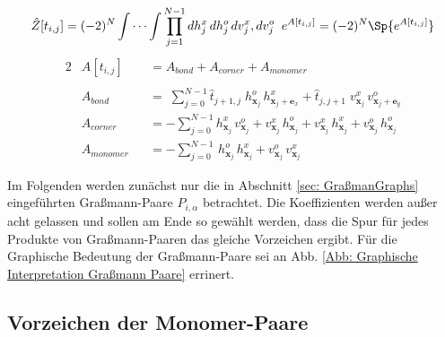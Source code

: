 \begin{grayframe}[frametitle = {Ausdruck für Pseudo-Zustandssumme mit Graßmann Variablen}]

\begin{equation}
    \begin{aligned}
        \hat{Z}[t_{i,j}]  & = (-2)^N \int \cdots \int\prod_{j=1}^{N-1} dh_{j}^x\,dh_{j}^o\,dv_{j}^x,dv_{j}^o \;\;e^{A[t_{i,j}] } = (-2)^N \Sp{e^{A[t_{i,j}] }} \nonumber\\
    \end{aligned}
\end{equation}
\begin{alignat}{2}
        & A[t_{i,j}]   &&= A_{bond} + A_{corner} + A_{monomer} \nonumber \\
        \label{eq: ZustandsBerezinIntegral} \\
        &A_{bond} &&= \; \sum_{j = 0}^{N-1} \hat{t}_{j+1, j} \; h_{\bm{x}_j}^o \,h_{\bm{x}_j+\bm{e}_x}^x
                                            + \hat{t}_{j, j+1} \; v_{\bm{x}_j}^x \,v_{\bm{x}_j+\bm{e}_y}^o \nonumber\\
       & A_{corner} &&= -\sum_{j = 0}^{N-1} h_{\bm{x}_j}^x \,v_{\bm{x}_j}^o 
                                            + v_{\bm{x}_j}^x\, h_{\bm{x}_j}^o
                                            + v_{\bm{x}_j}^x \,h_{\bm{x}_j}^x 
                                            + v_{\bm{x}_j}^o \,h_{\bm{x}_j}^o \nonumber\\
       &    A_{monomer}&&= -\sum_{j = 0}^{N-1} \, h_{\bm{x}_j}^o \,h_{\bm{x}_j}^x
                                            +  v_{\bm{x}_j}^o \,v_{\bm{x}_j}^x \nonumber
\end{alignat}
\end{grayframe}


Im Folgenden werden zunächst nur die in Abschnitt \ref{sec: GraßmanGraphs} eingeführten Graßmann-Paare $P_{i,\alpha}$ betrachtet. Die Koeffizienten werden außer acht gelassen und sollen am Ende so gewählt werden, dass die Spur für jedes Produkte von Graßmann-Paaren das gleiche Vorzeichen ergibt. Für die Graphische Bedeutung der Graßmann-Paare sei an Abb. \ref{Abb: Graphische Interpretation Graßmann Paare} errinert. 
 
\subsection{Vorzeichen der Monomer-Paare} \label{sec: vorzeicehnMonomer}

